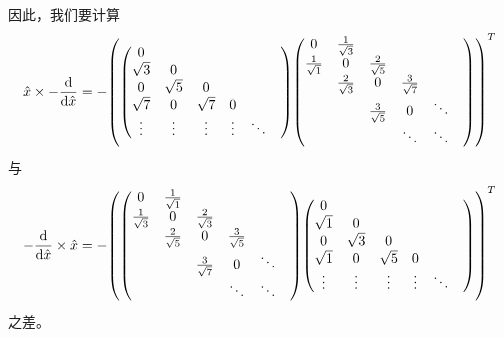 \documentclass[a4paper,unicode]{report}
\begin{document}
因此，我们要计算
\begin{equation}
    \hat{x}\times -\dv{\hat{x}} =
    -\qty(\mqty(
        0&    &&&&\\
        \sqrt{3}& 0&&&&\\
        0&   \sqrt{5}&   0&&&\\
        \sqrt{7}& 0 &   \sqrt{7}&    0&&\\
        \vdots&\vdots&\vdots& \vdots&\ddots&
    )\mqty(
        0&    \frac{1}{\sqrt{3}}&&&&\\
        \frac{1}{\sqrt{1}}& 0&  \frac{2}{\sqrt{5}}&&&\\
        &   \frac{2}{\sqrt{3}}&   0&\frac{3}{\sqrt{7}}&&\\
        &   &   \frac{3}{\sqrt{5}}&    0&\ddots&\\
        &&& \ddots&\ddots&
    ))^T
\end{equation}
与
\begin{equation}
    -\dv{\hat{x}}\times \hat{x} =
    -\qty(\mqty(
        0&    \frac{1}{\sqrt{1}}&&&&\\
        \frac{1}{\sqrt{3}}& 0&  \frac{2}{\sqrt{3}}&&&\\
        &   \frac{2}{\sqrt{5}}&   0&\frac{3}{\sqrt{5}}&&\\
        &   &   \frac{3}{\sqrt{7}}&    0&\ddots&\\
        &&& \ddots&\ddots&
    )\mqty(
        0&    &&&&\\
        \sqrt{1}& 0&&&&\\
        0&   \sqrt{3}&   0&&&\\
        \sqrt{1}& 0 &   \sqrt{5}&    0&&\\
        \vdots&\vdots&\vdots& \vdots&\ddots&
    ))^T
\end{equation}
之差。
\end{document}
